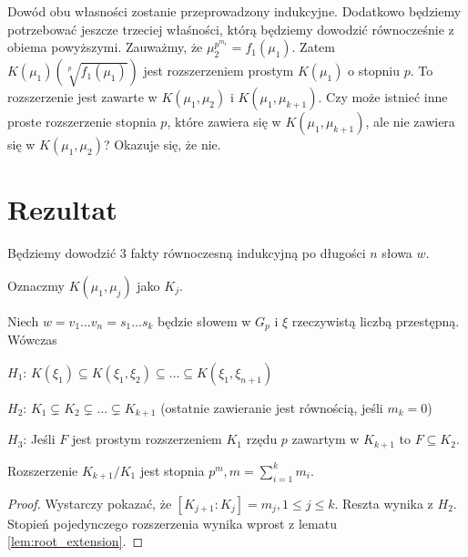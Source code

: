 Dowód obu własności zostanie przeprowadzony indukcyjne. Dodatkowo będziemy
potrzebować jeszcze trzeciej właśności, którą będziemy dowodzić równocześnie z
obiema powyższymi. Zauważmy, że $\mu_2^{p^{m_1}} = f_1\left(\mu_1\right)$.
Zatem $K\left(\mu_1\right)\left(\sqrt[p]{f_1\left(\mu_1\right)}\right)$ jest
rozszerzeniem prostym $K\left(\mu_1\right)$ o stopniu $p$.
To rozszerzenie jest zawarte w $K\left(\mu_1, \mu_2\right)$ i
$K\left(\mu_1, \mu_{k+1}\right)$.
Czy może istnieć inne proste rozszerzenie stopnia $p$, które zawiera się w
$K\left(\mu_1, \mu_{k+1}\right)$, ale nie zawiera się w $K\left(\mu_1,
\mu_2\right)$? Okazuje się, że nie.

\section{Rezultat}

Będziemy dowodzić 3 fakty równoczesną indukcyjną po długości $n$ słowa $w$.

Oznaczmy $K\left(\mu_1, \mu_j\right)$ jako $K_j$.

\begin{theorem}
  Niech $w = v_1 \ldots v_n = s_1 \ldots s_k$ będzie słowem w $G_p$ i $\xi$
  rzeczywistą liczbą przestępną. Wówczas

  \begin{description}
    \item{$H_1$:}
      $K\left(\xi_1\right)\subseteq
      K\left(\xi_1, \xi_2\right)\subseteq
      \ldots \subseteq
      K\left(\xi_1, \xi_{n+1}\right)$
    \item{$H_2$:}
      $K_1 \subsetneq K_2 \subsetneq \ldots \subsetneq K_{k+1}$ (ostatnie zawieranie jest
      równością, jeśli $m_k = 0$)
    \item{$H_3$:}
      Jeśli $F$ jest prostym rozszerzeniem $K_1$ rzędu $p$  zawartym w $K_{k+1}$
      to $F \subseteq K_2$.
  \end{description}
  \label{th:hypothesis_h}
\end{theorem}

\begin{corollary}
  Rozszerzenie $K_{k+1}/K_1$ jest stopnia $p^m, m = \sum_{i=1}^k m_i$.
\end{corollary}

\begin{proof}
  Wystarczy pokazać, że $\left[K_{j + 1} : K_j\right]
  = m_j, 1 \leq j \leq k$. Reszta wynika z $H_2$.  Stopień pojedynczego
  rozszerzenia wynika wprost z lematu \ref{lem:root_extension}.
\end{proof}

